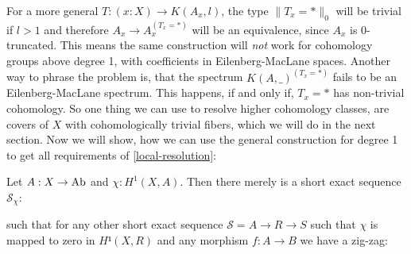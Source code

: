 For a more general $T:(x:X)\to K(A_x,l)$,
the type $\|T_x=\ast\|_0$ will be trivial if $l>1$ and therefore $A_x\to A_x^{(T_x=\ast)}$ will be an equivalence,
since $A_x$ is 0-truncated.
This means the same construction will \emph{not} work for cohomology groups above degree 1,
with coefficients in Eilenberg-MacLane spaces.
Another way to phrase the problem is,
that the spectrum $K(A,\_)^{(T_x=\ast)}$ fails to be an Eilenberg-MacLane spectrum.
This happens, if and only if, ${T_x=\ast}$ has non-trivial cohomology.
So one thing we can use to resolve higher cohomology classes, are covers of $X$ with cohomologically trivial fibers,
which we will do in the next section.
Now we will show, how we can use the general construction for degree 1 to get all requirements of \cref{local-resolution}:

\begin{lemma}
  \label{general-1-resolution-exists}
  Let $A:X\to\operatorname{Ab}$ and $\chi:H^1(X,A)$.
  Then there merely is a short exact sequence $\mathcal{S}_\chi$:
  \begin{center}
  \end{center}
  such that for any other short exact sequence $\mathcal{S}=A\to R\to S$
  such that $\chi$ is mapped to zero in $H¹(X,R)$ and any morphism $f:A\to B$ we have
  a zig-zag:
  \begin{center}
  \end{center}
\end{lemma}

